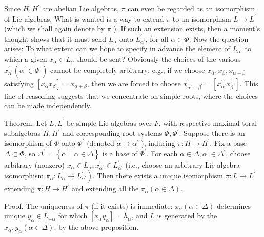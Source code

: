\documentclass[10pt]{article}
\begin{document}
Since $H, H^{\prime}$ are abelian Lie algebras, $\pi$ can even be regarded as an isomorphism of Lie algebras. What is wanted is a way to extend $\pi$ to an isomorphism $L \rightarrow L^{\prime}$ (which we shall again denote by $\pi$ ). If such an extension exists, then a moment's thought shows that it must send $L_{\alpha}$ onto $L_{\alpha^{\prime}}^{\prime}$, for all $\alpha \in \Phi$. Now the question arises: To what extent can we hope to specify in advance the element of $L_{\alpha^{\prime}}^{\prime}$ to which a given $x_{\alpha} \in L_{\alpha}$ should be sent? Obviously the choices of the various $x_{\alpha^{\prime}}^{\prime}\left(\alpha^{\prime} \in \Phi^{\prime}\right)$ cannot be completely arbitrary: e.g., if we choose $x_{\alpha}, x_{\beta}, x_{\alpha+\beta}$ satisfying $\left[x_{\alpha} x_{\beta}\right]=x_{\alpha+\beta}$, then we are forced to choose $x_{\alpha^{\prime}+\beta^{\prime}}^{\prime}=\left[x_{\alpha^{\prime}}^{\prime} x_{\beta^{\prime}}^{\prime}\right]$. This line of reasoning suggests that we concentrate on simple roots, where the choices can be made independently.

Theorem. Let $L, L^{\prime}$ be simple Lie algebras over $F$, with respective maximal toral subalgebras $H, H^{\prime}$ and corresponding root systems $\Phi, \Phi^{\prime}$. Suppose there is an isomorphism of $\Phi$ onto $\Phi^{\prime}$ (denoted $\alpha \mapsto \alpha^{\prime}$ ), inducing $\pi: H \rightarrow H^{\prime}$. Fix a base $\Delta \subset \Phi$, so $\Delta^{\prime}=\left\{\alpha^{\prime} \mid \alpha \in \Delta\right\}$ is a base of $\Phi^{\prime}$. For each $\alpha \in \Delta, \alpha^{\prime} \in \Delta^{\prime}$, choose arbitrary (nonzero) $x_{\alpha} \in L_{\alpha}, x_{\alpha^{\prime}}^{\prime} \in L_{\alpha^{\prime}}^{\prime}$ (i.e., choose an arbitrary Lie algebra isomorphism $\left.\pi_{\alpha}: L_{\alpha} \rightarrow L_{\alpha^{\prime}}^{\prime}\right)$. Then there exists a unique isomorphism $\pi: L \rightarrow L^{\prime}$ extending $\pi: H \rightarrow H^{\prime}$ and extending all the $\pi_{\alpha}(\alpha \in \Delta)$.

Proof. The uniqueness of $\pi$ (if it exists) is immediate: $x_{\alpha}(\alpha \in \Delta)$ determines unique $y_{\alpha} \in L_{-\alpha}$ for which $\left[x_{\alpha} y_{\alpha}\right]=h_{\alpha}$, and $L$ is generated by the $x_{\alpha}, y_{\alpha}(\alpha \in \Delta)$, by the above proposition.
\end{document}
